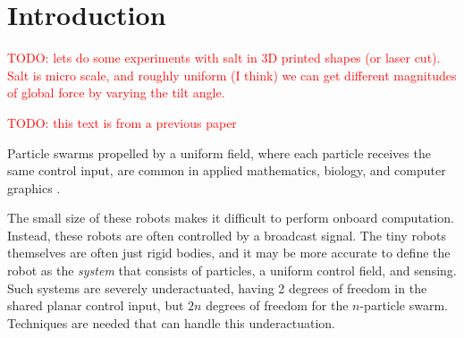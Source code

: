 \section{Introduction}\label{sec:Intro}

   \textcolor{red}{TODO: lets do some experiments with salt in 3D printed shapes (or laser cut). Salt is micro scale, and roughly uniform (I think) we can get different magnitudes of global force by varying the tilt angle.}
   

   \textcolor{red}{TODO: this text is from a previous paper}

Particle swarms propelled by a uniform field, where each particle  receives the same control input, are common in applied mathematics, biology, and computer graphics \cite{Peyer2013,Shirai2005,Chiang2011}.

The small size of these robots makes it difficult to perform onboard computation.  Instead, these robots are often controlled by a broadcast signal. 
 The tiny robots themselves are often just rigid bodies, and it may be more accurate to define the robot as the \emph{system} that consists of particles, a uniform control field, and sensing.
Such systems are severely underactuated, having 2 degrees of freedom in the shared planar control input, but $2n$ degrees of freedom for the $n$-particle swarm.
 Techniques are needed that can handle this underactuation. 

